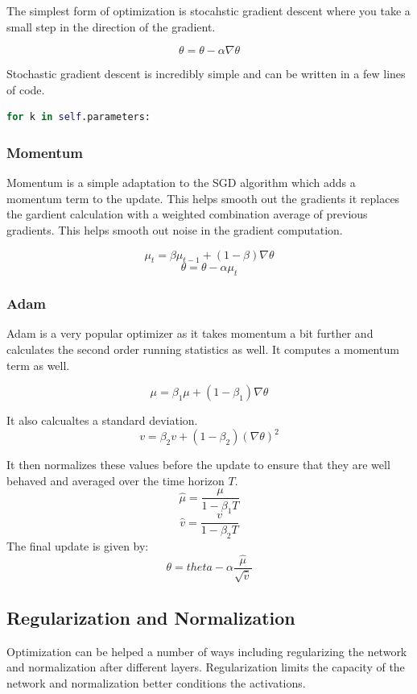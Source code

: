\documentclass{article}
\begin{document}
The simplest form of optimization is stocahstic gradient
descent where you take a small step in the direction
of the gradient.

$$
\theta = \theta - \alpha \nabla \theta
$$

Stochastic gradient descent is incredibly simple and can
be written in a few lines of code.

\begin{lstlisting}[language=Python]
for k in self.parameters:
\end{lstlisting}

\subsubsection*{Momentum}

Momentum is a simple adaptation to the SGD algorithm which adds
a momentum term to the update. This helps smooth out the gradients
it replaces the gardient calculation with a weighted combination 
average of previous gradients. This helps smooth out noise in the
gradient computation.

$$
\mu_{t} = \beta \mu_{t-1} + 
(1 - \beta)\nabla \theta
$$
$$
\theta = \theta - \alpha \mu_t
$$

\subsubsection*{Adam}
Adam is a very popular optimizer as it takes momentum a bit further
and calculates the second order running statistics as well. It computes
a momentum term as well.

$$
\mu = \beta_1 \mu + (1 - \beta_1)\nabla \theta
$$

It also calcualtes a standard deviation.
$$
v = \beta_2 v + (1 - \beta_2)(\nabla \theta) ^ 2
$$

It then normalizes these values before the update to ensure that
they are well behaved and averaged over the time horizon $T$.
$$
\hat \mu = \frac{\mu}{1 - \beta_1T}
$$
$$
\hat v = \frac{v}{1 - \beta_2T}
$$
The final update is given by:
$$
\theta = theta - \alpha \frac{\hat \mu}{\sqrt{\hat v}}
$$

\subsection*{Regularization and Normalization}
Optimization can be helped a number of ways including 
regularizing the network and normalization after different
layers. Regularization limits the capacity of the network
and normalization better conditions the activations.
\end{document}
